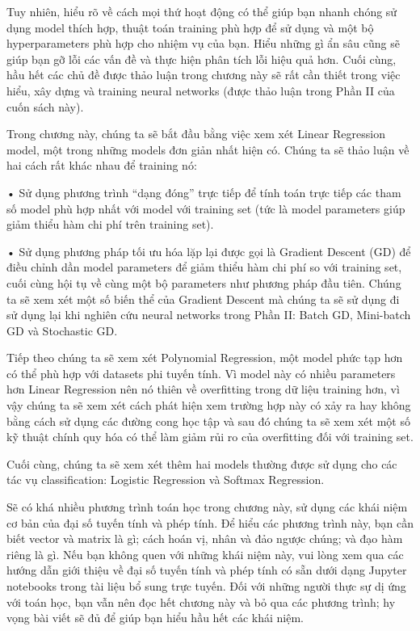 Tuy nhiên, hiểu rõ về cách mọi thứ hoạt động có thể giúp bạn nhanh chóng sử dụng model thích hợp, thuật toán training phù hợp để sử dụng và một bộ hyperparameters phù hợp cho nhiệm vụ của bạn. Hiểu những gì ẩn sâu cũng sẽ giúp bạn gỡ lỗi các vấn đề và thực hiện phân tích lỗi hiệu quả hơn. Cuối cùng, hầu hết các chủ đề được thảo luận trong chương này sẽ rất cần thiết trong việc hiểu, xây dựng và training neural networks (được thảo luận trong Phần II của cuốn sách này).

Trong chương này, chúng ta sẽ bắt đầu bằng việc xem xét Linear Regression model, một trong những models đơn giản nhất hiện có. Chúng ta sẽ thảo luận về hai cách rất khác nhau để training nó:

• Sử dụng phương trình “dạng đóng” trực tiếp để tính toán trực tiếp các tham số model phù hợp nhất với model với training set (tức là model parameters giúp giảm thiểu hàm chi phí trên training set).

• Sử dụng phương pháp tối ưu hóa lặp lại được gọi là Gradient Descent (GD) để điều chỉnh dần model parameters để giảm thiểu hàm chi phí so với training set, cuối cùng hội tụ về cùng một bộ parameters như phương pháp đầu tiên. Chúng ta sẽ xem xét một số biến thể của Gradient Descent mà chúng ta sẽ sử dụng đi sử dụng lại khi nghiên cứu neural networks trong Phần II: Batch GD, Mini-batch GD và Stochastic GD.

Tiếp theo chúng ta sẽ xem xét Polynomial Regression, một model phức tạp hơn có thể phù hợp với datasets phi tuyến tính. Vì model này có nhiều parameters hơn Linear Regression nên nó thiên về overfitting trong dữ liệu training hơn, vì vậy chúng ta sẽ xem xét cách phát hiện xem trường hợp này có xảy ra hay không bằng cách sử dụng các đường cong học tập và sau đó chúng ta sẽ xem xét một số kỹ thuật chính quy hóa có thể làm giảm rủi ro của overfitting đối với training set.

Cuối cùng, chúng ta sẽ xem xét thêm hai models thường được sử dụng cho các tác vụ classification: Logistic Regression và Softmax Regression.

Sẽ có khá nhiều phương trình toán học trong chương này, sử dụng các khái niệm cơ bản của đại số tuyến tính và phép tính. Để hiểu các phương trình này, bạn cần biết vector và matrix là gì; cách hoán vị, nhân và đảo ngược chúng; và đạo hàm riêng là gì. Nếu bạn không quen với những khái niệm này, vui lòng xem qua các hướng dẫn giới thiệu về đại số tuyến tính và phép tính có sẵn dưới dạng Jupyter notebooks trong tài liệu bổ sung trực tuyến. Đối với những người thực sự dị ứng với toán học, bạn vẫn nên đọc hết chương này và bỏ qua các phương trình; hy vọng bài viết sẽ đủ để giúp bạn hiểu hầu hết các khái niệm.


